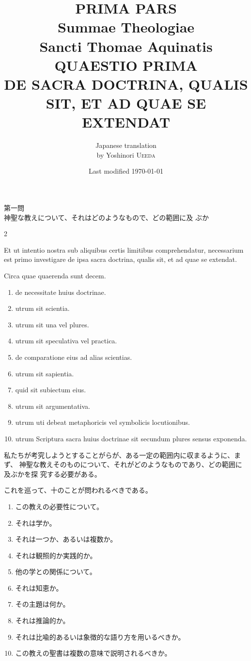 \documentclass[
paper=a4paper,
fontsize=10pt,
jafontsize=9pt,
titlepage
]{jlreq}
\title{{\bfseries PRIMA PARS}\\{\Huge Summae Theologiae}\\Sancti Thomae
Aquinatis\\{\sffamily QUAESTIO PRIMA}\\DE SACRA DOCTRINA, QUALIS SIT,
ET AD QUAE SE EXTENDAT}
\author{Japanese translation\\by Yoshinori {\scshape Ueeda}}
\date{Last modified \today}
\begin{document}
\maketitle
\pagestyle{fancy}

\begin{center}
{\Large 第一問\\神聖な教えについて、それはどのようなもので、どの範囲に及
 ぶか}
\end{center}

\begin{paracol}{2}

Et ut intentio nostra sub aliquibus certis limitibus comprehendatur,
 necessarium est primo investigare de ipsa sacra doctrina, qualis sit,
 et ad quae se extendat. 

Circa quae quaerenda sunt decem. 

\begin{enumerate}
 \item de necessitate huius doctrinae.
 \item utrum sit scientia.
 \item utrum sit una vel plures.
 \item utrum sit speculativa vel practica.
 \item de comparatione eius ad alias scientias.
 \item utrum sit sapientia.
 \item quid sit subiectum eius. 
 \item utrum sit argumentativa.
 \item utrum uti debeat metaphoricis vel symbolicis locutionibus.
 \item utrum Scriptura sacra huius doctrinae sit secundum plures sensus exponenda.

\end{enumerate}

\switchcolumn

私たちが考究しようとすることがらが、ある一定の範囲内に収まるように、まず、
 神聖な教えそのものについて、それがどのようなものであり、どの範囲に及ぶかを探
 究する必要がある。

これを巡って、十のことが問われるべきである。

\begin{enumerate}
 \item この教えの必要性について。
 \item それは学か。
 \item それは一つか、あるいは複数か。
 \item それは観照的か実践的か。
 \item 他の学との関係について。
 \item それは知恵か。
 \item その主題は何か。
 \item それは推論的か。
 \item それは比喩的あるいは象徴的な語り方を用いるべきか。
 \item この教えの聖書は複数の意味で説明されるべきか。
\end{enumerate}

\end{paracol}
\end{document}
